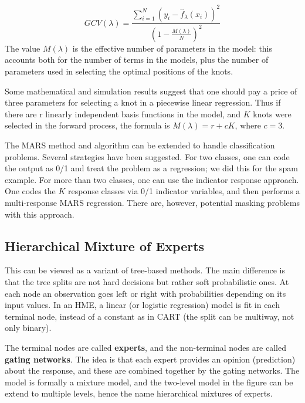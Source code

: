 \begin{equation}
GCV(\lambda) = \frac{\sum_{i=1}^N (y_i - \hat{f}_\lambda(x_i))^2}{(1-\frac{M(\lambda)}{N})^2}
\end{equation}
The value $M(\lambda)$ is the effective number of parameters in the model: this accounts both for the number of terms in the models, plus the number of parameters used in selecting the optimal positions of the knots.

Some mathematical and simulation results suggest that one should pay a price of three parameters for selecting a knot in a piecewise linear regression.
Thus if there are r linearly independent basis functions in the model, and $K$ knots were selected in the forward process, the formula is $M(\lambda) = r+cK$, where $c = 3$.

The MARS method and algorithm can be extended to handle classification problems. Several strategies have been suggested. For two classes, one can code the output as 0/1 and treat the problem as a regression; we did this for the spam example. For more than two classes, one can use the indicator response approach. One codes the $K$ response classes via 0/1 indicator variables, and then performs a multi-response MARS regression. There are, however, potential masking problems with this approach.

\subsection{Hierarchical Mixture of Experts}
This can be viewed as a variant of tree-based methods. The main difference is that the tree splits are not hard decisions but rather soft probabilistic ones. At each node an observation goes left or right with probabilities depending on its input values. In an HME, a linear (or logistic regression) model is fit in each terminal node, instead of a constant as in CART (the split can be multiway, not only binary).

The terminal nodes are called \textbf{experts}, and the non-terminal nodes are called \textbf{gating networks}. The idea is that each expert provides an opinion (prediction) about the response, and these are combined together by the gating networks. The model is formally a mixture model, and the two-level model in the figure can be extend to multiple levels, hence the name hierarchical mixtures of experts.

